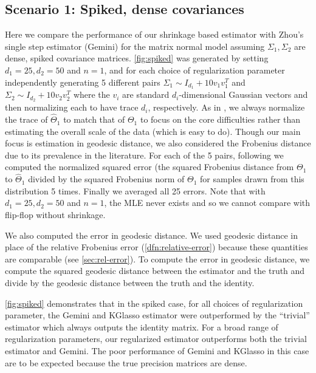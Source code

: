 \documentclass[aos]{imsart}
\theoremstyle{definition}
\numberwithin{equation}{section}
\newcommand{\htheta}{\widehat{\Theta}}
\begin{document}
\subsection{Scenario 1: Spiked, dense covariances}
Here we compare the performance of our shrinkage based estimator with Zhou's single step estimator (Gemini) for the matrix normal model assuming $\Sigma_1, \Sigma_2$ are dense, spiked covariance matrices.
\cref{fig:spiked} was generated by setting $d_1 = 25, d_2 = 50$ and $n = 1$, and for each choice of regularization parameter independently generating 5 different pairs $\Sigma_1 \sim I_{d_1} + 10 v_1v_1^T$ and $\Sigma_2 \sim I_{d_2} + 10 v_2v_2^T$ where the $v_i$ are standard $d_i$-dimensional Gaussian vectors and then normalizing each to have trace $d_i$, respectively.
As in \cite{zhou2014gemini}, we always normalize the trace of $\htheta_1$ to match that of $\Theta_1$ to focus on the core difficulties rather than estimating the overall scale of the data (which is easy to do). Though our main focus is estimation in geodesic distance, we also considered the Frobenius distance due to its prevalence in the literature.
For each of the 5 pairs, following \cite{tsiligkaridis2013convergence} we computed the normalized squared error (the squared Frobenius distance from $\Theta_1$ to $\htheta_1$ divided by the squared Frobenius norm of $\Theta_1$ for samples drawn from this distribution 5 times.
Finally we averaged all 25 errors.
Note that with $d_1 = 25, d_2 = 50$ and $n = 1$, the MLE never exists and so we cannot compare with flip-flop without shrinkage.

We also computed the error in geodesic distance. We used geodesic distance in place of the relative Frobenius error (\cref{dfn:relative-error}) because these quantities are comparable (see \cref{sec:rel-error}).
To compute the error in geodesic distance, we compute the squared geodesic distance between the estimator and the truth and divide by the geodesic distance between the truth and the identity.

\cref{fig:spiked} demonstrates that in the spiked case, for all choices of regularization parameter, the Gemini and KGlasso estimator were outperformed by the ``trivial'' estimator which always outputs the identity matrix.
For a broad range of regularization parameters, our regularized estimator outperforms both the trivial estimator and Gemini.
The poor performance of Gemini and KGlasso in this case are to be expected because the true precision matrices are dense.
\end{document}
